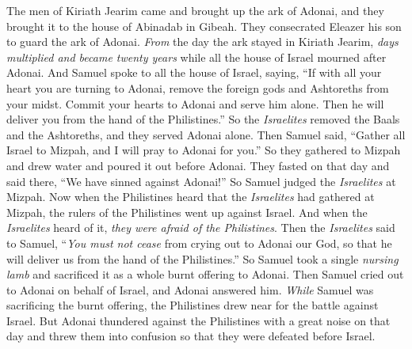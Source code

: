 \begin{biblechapter} %
 The men of Kiriath Jearim came and brought up the ark of Adonai, and they brought it to the house of Abinadab in Gibeah. They consecrated Eleazer his son to guard the ark of Adonai.
\verse \textit{From} the day the ark stayed in Kiriath Jearim, \textit{days multiplied and became twenty years} while all the house of Israel mourned after Adonai.
\verse And Samuel spoke to all the house of Israel, saying, “If with all your heart you are turning to Adonai, remove the foreign gods and Ashtoreths from your midst. Commit your hearts to Adonai and serve him alone. Then he will deliver you from the hand of the Philistines.”
\verse So the \textit{Israelites} removed the Baals and the Ashtoreths, and they served Adonai alone.
\verse Then Samuel said, “Gather all Israel to Mizpah, and I will pray to Adonai for you.”
\verse So they gathered to Mizpah and drew water and poured it out before Adonai. They fasted on that day and said there, “We have sinned against Adonai!” So Samuel judged the \textit{Israelites} at Mizpah.
\verse Now when the Philistines heard that the \textit{Israelites} had gathered at Mizpah, the rulers of the Philistines went up against Israel. And when the \textit{Israelites} heard of it, \textit{they were afraid of the Philistines}.
\verse Then the \textit{Israelites} said to Samuel, “\textit{You must not cease} from crying out to Adonai our God, so that he will deliver us from the hand of the Philistines.”
\verse So Samuel took a single \textit{nursing lamb} and sacrificed it as a whole burnt offering to Adonai. Then Samuel cried out to Adonai on behalf of Israel, and Adonai answered him.
\verse \textit{While} Samuel was sacrificing the burnt offering, the Philistines drew near for the battle against Israel. But Adonai thundered against the Philistines with a great noise on that day and threw them into confusion so that they were defeated before Israel.

\end{biblechapter}
